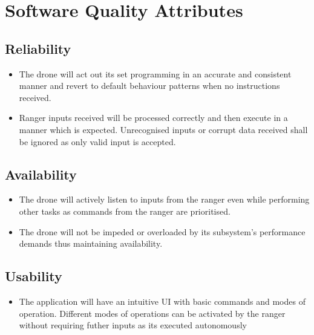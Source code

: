 \section{Software Quality Attributes}
\subsection {Reliability}
\begin{itemize}
	\item The drone will act out its set programming in an accurate and consistent manner and revert to default behaviour patterns when no instructions received.  
	\item Ranger inputs received will be processed correctly and then execute in a manner which is expected. Unrecognised inputs or corrupt data received shall be ignored as only valid input is accepted.
\end{itemize}

\subsection {Availability}
\begin{itemize}
	\item The drone will actively listen to inputs from the ranger even while performing other tasks as commands from the ranger are prioritised. 
	\item The drone will not be impeded or overloaded by its subsystem's performance demands thus maintaining availability. 
\end{itemize}

\subsection {Usability}
\begin{itemize}
	\item The application will have an intuitive UI with basic commands and modes of operation. Different modes of operations can be activated  by the ranger without requiring futher inputs as its executed autonomously 
\end{itemize}

